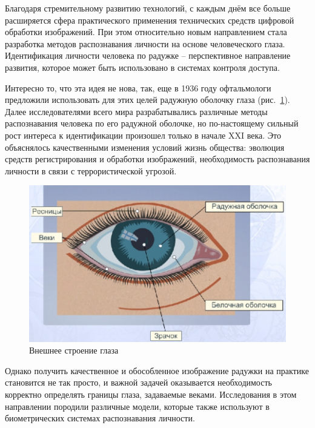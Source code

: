 \documentclass[12pt]{article} %
\begin{document}
Благодаря стремительному развитию технологий, с каждым днём все больше расширяется сфера практического применения технических средств цифровой обработки изображений. При этом относительно новым направлением стала разработка методов распознавания личности на основе человеческого глаза. Идентификация личности человека по радужке – перспективное направление развития, которое может быть использовано в системах контроля доступа. 

Интересно то, что эта идея не нова, так, еще в 1936 году офтальмологи \cite{Medic} предложили использовать для этих целей радужную оболочку глаза (рис.~\ref{fig:glaz}). Далее исследователями всего мира разрабатывались различные методы распознавания человека по его радужной оболочке, но по-настоящему сильный рост интереса к идентификации произошел только в начале XXI века. Это объяснялось качественными изменения условий жизнь общества: эволюция средств регистрирования и обработки изображений, необходимость распознавания личности в связи с террористической угрозой\cite{Conf3, Terr, Tech}. 

\begin{figure}[h]
	
	\centering
	
	\includegraphics[width=0.6\linewidth]{glaz.jpg}
	
	\caption{Внешнее строение глаза}
	
	\label{fig:glaz}
	
\end{figure}

Однако получить качественное и обособленное изображение радужки на практике становится не так просто, и важной задачей оказывается необходимость корректно определять границы глаза, задаваемые веками. Исследования в этом направлении породили различные модели, которые также используют в биометрических системах распознавания личности. 
\end{document}
